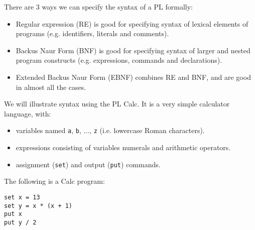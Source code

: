 \documentclass[a4paper, openany]{memoir}
\begin{document}
There are 3 ways we can specify the syntax of a PL formally:
\begin{itemize}
    \item Regular expression (RE) is good for specifying syntax of lexical elements of programs (e.g. identifiers, literals and comments).
    \item Backus Naur Form (BNF) is good for specifying syntax of larger and nested program constructs (e.g. expressions, commands and declarations).
    \item Extended Backus Naur Form (EBNF) combines RE and BNF, and are good in almost all the cases.
\end{itemize}

We will illustrate syntax using the PL Calc. It is a very simple calculator language, with:
\begin{itemize}
    \item variables named \texttt{a}, \texttt{b}, ..., \texttt{z} (i.e. lowercase Roman characters).
    \item expressions consisting of variables numerals and arithmetic operators.
    \item assignment (\texttt{set}) and output (\texttt{put}) commands.
\end{itemize}
The following is a Calc program:
\begin{lstlisting}[language=calc]
set x = 13
set y = x * (x + 1)
put x
put y / 2
\end{lstlisting}
\end{document}
